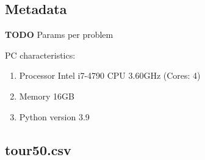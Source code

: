 \documentclass[a4paper,10pt]{article}
\newcommand{\ReplaceMe}[1]{{\color{blue}#1}}
\begin{document}
\subsection{Metadata}

	\textbf{TODO} Params per problem

	PC characteristics:
	\begin{enumerate}
		\item Processor Intel i7-4790 CPU \@ 3.60GHz (Cores: 4)
		\item Memory 16GB
		\item Python version 3.9
	\end{enumerate}
	
	



\subsection{tour50.csv}
\end{document}
